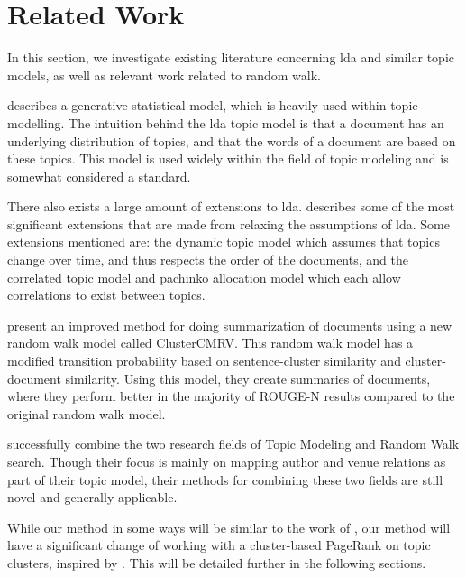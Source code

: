 \section{Related Work}\label{sec:related-works}
In this section, we investigate existing literature concerning \gls{lda} and similar topic models, as well as relevant work related to random walk.

\citet{lda} describes a generative statistical model, which is heavily used within topic modelling. 
The intuition behind the \gls{lda} topic model is that a document has an underlying distribution of topics, and that the words of a document are based on these topics.
This model is used widely within the field of topic modeling and is somewhat considered a standard.

There also exists a large amount of extensions to \gls{lda}.
\citet{blei2012topicmodels} describes some of the most significant extensions that are made from relaxing the assumptions of \gls{lda}.
Some extensions mentioned are: the dynamic topic model\cite{blei2006dynamic} which assumes that topics change over time, and thus respects the order of the documents, and the correlated topic model\cite{blei2007correlated} and pachinko allocation model\cite{li2006pachinko} which each allow correlations to exist between topics.

\citet{ClusterPageRank} present an improved method for doing summarization of documents using a new random walk model called ClusterCMRV. 
This random walk model has a modified transition probability based on sentence-cluster similarity and cluster-document similarity.
Using this model, they create summaries of documents, where they perform better in the majority of ROUGE-N results compared to the original random walk model.

\citet{Tang2008} successfully combine the two research fields of Topic Modeling and Random Walk search. Though their focus is mainly on mapping author and venue relations as part of their topic model, their methods for combining these two fields are still novel and generally applicable.

While our method in some ways will be similar to the work of \citeauthor{Tang2008}, our method will have a significant change of working with a cluster-based PageRank on topic clusters, inspired by \cite{ClusterPageRank}.
This will be detailed further in the following sections.

